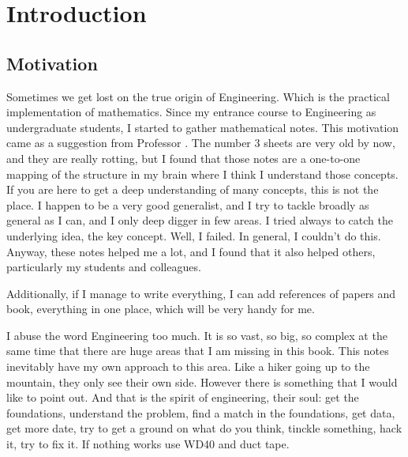 \documentclass[11pt,fleqn]{book} %
\begin{document}
\pagestyle{fancy} %



\chapter{Introduction}

\section{Motivation}


Sometimes we get lost on the true origin of Engineering.
Which is the practical implementation of mathematics.  Since my entrance course to Engineering as undergraduate students, I started to gather mathematical notes.  This motivation came as a suggestion from Professor .
The number 3 sheets are very old by now, and they are really rotting, but I found that those notes are a one-to-one mapping of the structure in my brain where I think I understand those concepts.  If you are here to get a deep understanding of many concepts, this is not the place.  I happen to be a very good generalist, and I try to tackle broadly as general as I can, and I only deep digger in few areas.  I tried always to catch the underlying idea, the key concept.  Well, I failed.  In general, I couldn't do this.  Anyway, these notes helped me a lot, and I found that it also helped others, particularly my students and colleagues.

Additionally, if I manage to write everything, I can add references of papers and book, everything in one place, which will be very handy for me.

I abuse the word Engineering too much.  It is so vast, so big, so complex at the same time that there are huge areas that I am missing in this book.  This notes inevitably have my own approach to this area.  Like a hiker going up to the mountain, they only see their own side.   However there is something that I would like to point out.  And that is the spirit of engineering, their soul:  get the foundations, understand the problem, find a match in the foundations, get data, get more date, try to get a ground on what do you think, tinckle something, hack it, try to fix it. If nothing works use WD40 and duct tape.
\end{document}
